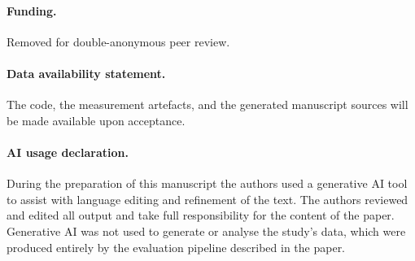 \documentclass[11pt]{article}
\begin{document}
\paragraph{Funding.}

Removed for double-anonymous peer review.


\paragraph{Data availability statement.}

The code, the measurement artefacts, and the generated manuscript sources will be
made available upon acceptance.


\paragraph{AI usage declaration.}
During the preparation of this manuscript the authors used a generative AI tool to
assist with language editing and refinement of the text. The authors reviewed and
edited all output and take full responsibility for the content of the paper.
Generative AI was not used to generate or analyse the study's data, which were
produced entirely by the evaluation pipeline described in the paper.



\end{document}
